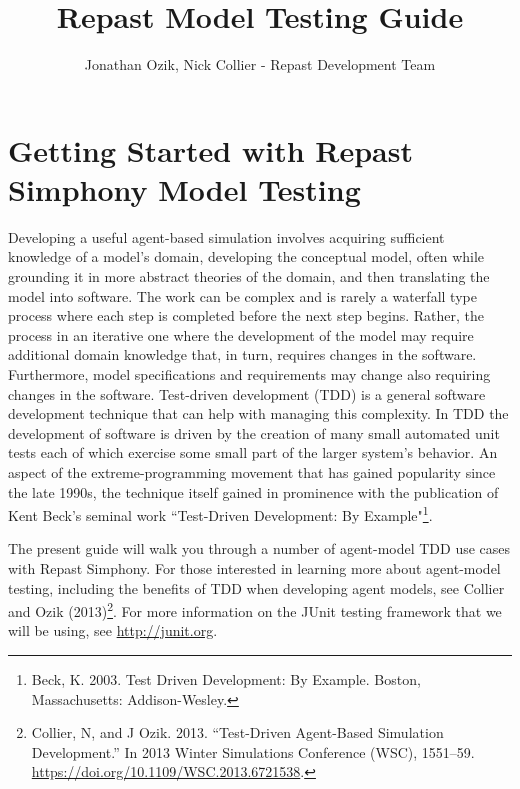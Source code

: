 \documentclass[11pt]{amsart}
\title{Repast Model Testing Guide}
\author{Jonathan Ozik, Nick Collier - Repast Development Team}
\begin{document}
 
\maketitle
\setcounter{section}{-1}



\section{Getting Started with Repast Simphony Model Testing}

Developing a useful agent-based simulation involves acquiring sufficient knowledge of a model's domain, developing the conceptual model, often while grounding it in more abstract theories of the domain, and then translating the model into software. The work can be complex and is rarely a waterfall type process where each step is completed before the next step begins. Rather, the process in an iterative one where the development of the model may require additional domain knowledge that, in turn, requires changes in the software. Furthermore, model specifications and requirements may change also requiring changes in the software. Test-driven development (TDD) is a general software development technique that can help with managing this complexity. In TDD the development of software is driven by the creation of many small automated unit tests each of which exercise some small part of the larger system's behavior. An aspect of the extreme-programming movement that has gained popularity since the late 1990s, the technique itself gained in prominence with the publication of Kent Beck's seminal work ``Test-Driven Development: By Example"\footnote{Beck, K. 2003. Test Driven Development: By Example. Boston, Massachusetts: Addison-Wesley.}.

The present guide will walk you through a number of agent-model TDD use cases with Repast Simphony. For those interested in learning more about agent-model testing, including the benefits of TDD when developing agent models, see Collier and Ozik (2013)\footnote{Collier, N, and J Ozik. 2013. ``Test-Driven Agent-Based Simulation Development.'' In 2013 Winter Simulations Conference (WSC), 1551–59. \url{https://doi.org/10.1109/WSC.2013.6721538}.}. For more information on the JUnit testing framework that we will be using, see \href{http://junit.org}{http://junit.org}.
\end{document}
